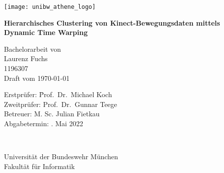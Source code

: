 \thispagestyle{empty}
\cleardoublepage

\thispagestyle{empty}

\begin{center}

\vspace*{1cm}

\texttt{[image: unibw\_athene\_logo]}

\vspace{1.5cm}
{\Huge
\textbf{Hierarchisches Clustering von Kinect-Bewegungsdaten mittels Dynamic Time Warping}\\
}
\vspace{1.5cm}


{\Large
Bachelorarbeit von\\
Laurenz Fuchs\\
1196307\\
Draft vom \today %
}
\vspace{1cm}

\parbox{1cm}{
\begin{large}
\begin{tabbing}
Erstprüfer: \hspace{.5cm} \=Prof.\ Dr.\ Michael Koch\\[2mm]
Zweitprüfer: \>Prof.\ Dr.\ Gunnar Teege\\[2mm]
Betreuer:
\>M. Sc. Julian Fietkau\\[5mm]
Abgabetermin: . Mai 2022\\
\end{tabbing}
\end{large}}\\
\vspace{5mm}

\vfill

{\Large
Universität der Bundeswehr München\\
Fakultät für Informatik\\
}

\end{center}
